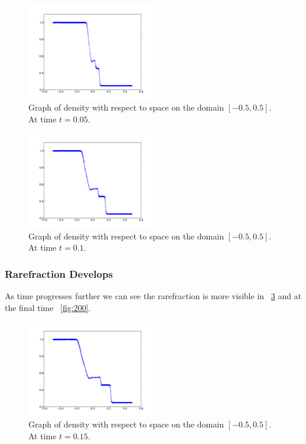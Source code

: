 \documentclass[11pt,letterpaper]{article}
\begin{document}
\begin{figure}[bth]
\centering
\includegraphics[width=0.5\textwidth]{5.pdf}
\caption{Graph of density with respect to space on the domain 
$[-0.5,0.5]$. At time $t = 0.05$.}
\label{fig:5}
\end{figure}


\begin{figure}[bth]
\centering
\includegraphics[width=0.5\textwidth]{10.pdf}
\caption{Graph of density with respect to space on the domain 
$[-0.5,0.5]$. At time $t = 0.1$.}
\label{fig:10}
\end{figure}

\subsubsection{Rarefraction Develops}

As time progresses further we can see the rarefraction is more visible in
 ~\ref{fig:15} and at the final time  ~\ref{fig:200}. 

\begin{figure}[bth]
\centering
\includegraphics[width=0.5\textwidth]{150.pdf}
\caption{Graph of density with respect to space on the domain 
$[-0.5,0.5]$. At time $t = 0.15$.}
\label{fig:15}
\end{figure}
\end{document}
